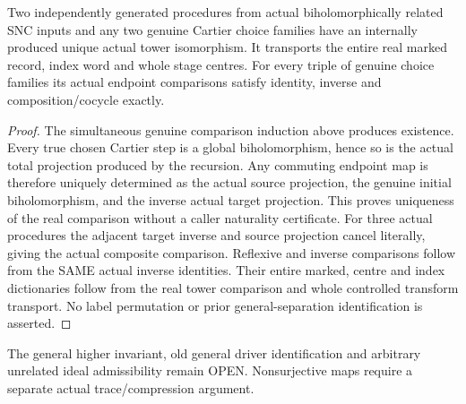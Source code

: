 \begin{theorem}
\label{hir:nc-ordered-choice-actual-comparison-cocycle}
\leanok
Two independently generated procedures from actual biholomorphically related
SNC inputs and any two genuine Cartier choice families have an internally
produced unique actual tower isomorphism. It transports the entire real marked
record, index word and whole stage centres. For every triple of genuine choice
families its actual endpoint comparisons satisfy identity, inverse and
composition/cocycle exactly.
\end{theorem}
\begin{proof}
The simultaneous genuine comparison induction above produces existence.
Every true chosen Cartier step is a global biholomorphism, hence so is the
actual total projection produced by the recursion. Any commuting endpoint
map is therefore uniquely determined as the actual source projection, the
genuine initial biholomorphism, and the inverse actual target projection.
This proves uniqueness of the real comparison without a caller naturality
certificate. For three actual procedures the adjacent target inverse and
source projection cancel literally, giving the actual composite comparison.
Reflexive and inverse comparisons follow from the SAME actual inverse
identities. Their entire marked, centre and index dictionaries follow from
the real tower comparison and whole controlled transform transport. No
label permutation or prior general-separation identification is asserted.
\end{proof}

The general higher invariant, old general driver identification and arbitrary
unrelated ideal admissibility remain OPEN. Nonsurjective maps require a separate
actual trace/compression argument.
